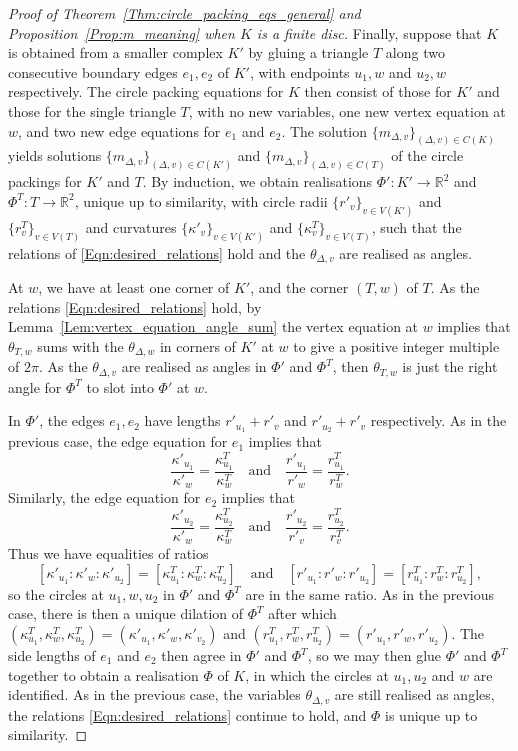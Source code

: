 \documentclass[12pt]{amsart}
\numberwithin{equation}{section}
\theoremstyle{named}
\newcommand{\refeqn}[1]{\eqref{Eqn:#1}}
\newcommand{\reflem}[1]{Lemma~\ref{Lem:#1}}
\newcommand{\refprop}[1]{Proposition~\ref{Prop:#1}}
\newcommand{\refthm}[1]{Theorem~\ref{Thm:#1}}
\newcommand{\R}{\mathbb{R}}
\newcommand{\To}{\longrightarrow}
\begin{document}
\begin{proof}[Proof of \refthm{circle_packing_eqs_general} and \refprop{m_meaning} when $K$ is a finite disc]
Finally, suppose that $K$ is obtained from a smaller complex $K'$ by gluing a triangle $T$ along two consecutive boundary edges $e_1, e_2$ of $K'$, with endpoints $u_1, w$ and $u_2, w$ respectively. The circle packing equations for $K$ then consist of those for $K'$ and those for the single triangle $T$, with no new variables, one new vertex equation at $w$, and two new edge equations for $e_1$ and $e_2$.
The solution $\{m_{\Delta,v}\}_{(\Delta,v) \in C(K)}$ yields solutions $\{m_{\Delta,v}\}_{(\Delta,v) \in C(K')}$ and $\{m_{\Delta,v}\}_{(\Delta,v) \in C(T)}$ of the circle packings for $K'$ and $T$. By induction, we obtain realisations $\Phi' \colon K' \To \R^2$ and $\Phi^T \colon T \To \R^2$, unique up to similarity, with circle radii $\{r'_v\}_{v \in V(K')}$ and $\{r^T_v\}_{v \in V(T)}$ and curvatures $\{\kappa'_v\}_{v \in V(K')}$ and $\{\kappa^T_v\}_{v \in V(T)}$, such that the relations of \refeqn{desired_relations} hold and the $\theta_{\Delta,v}$ are realised as angles.

At $w$, we have at least one corner of $K'$, and the corner $(T, w)$ of $T$. As the relations \refeqn{desired_relations} hold, by \reflem{vertex_equation_angle_sum} the vertex equation at $w$ implies that $\theta_{T,w}$ sums with the $\theta_{\Delta,w}$ in corners of $K'$ at $w$ to give a positive integer multiple of $2\pi$. As the $\theta_{\Delta,v}$ are realised as angles in $\Phi'$ and $\Phi^T$, then $\theta_{T,w}$ is just the right angle for $\Phi^T$ to slot into $\Phi'$ at $w$.

In $\Phi'$, the edges $e_1, e_2$ have lengths $r'_{u_1} + r'_v$ and $r'_{u_2} + r'_v$ respectively. As in the previous case, the edge equation for $e_1$ implies that
\[
\frac{\kappa'_{u_1}}{\kappa'_w} = \frac{\kappa^T_{u_1}}{\kappa^T_w}
\quad \text{and} \quad
\frac{r'_{u_1}}{r'_w} = \frac{r^T_{u_1}}{r^T_w}.
\]
Similarly, the edge equation for $e_2$ implies that
\[
\frac{\kappa'_{u_2}}{\kappa'_w} = \frac{\kappa^T_{u_2}}{\kappa^T_w}
\quad \text{and} \quad
\frac{r'_{u_2}}{r'_v} = \frac{r^T_{u_2}}{r^T_v}.
\]
Thus we have equalities of ratios
\[
\left[ \kappa'_{u_1} : \kappa'_w : \kappa'_{u_2} \right]
= \left[ \kappa^T_{u_1} : \kappa^T_w : \kappa^T_{u_2} \right]
\quad \text{and} \quad
\left[ r'_{u_1} : r'_w : r'_{u_2} \right]
= \left[ r^T_{u_1} : r^T_w : r^T_{u_2} \right],
\]
so the circles at $u_1, w, u_2$ in $\Phi'$ and $\Phi^T$ are in the same ratio. As in the previous case, there is then a unique dilation of $\Phi^T$ after which $(\kappa^T_{u_1}, \kappa^T_w, \kappa^T_{u_2}) = (\kappa'_{u_1}, \kappa'_w, \kappa'_{v_2})$ and $(r^T_{u_1}, r^T_w, r^T_{u_2}) = (r'_{u_1}, r'_w, r'_{u_2})$. The side lengths of $e_1$ and $e_2$ then agree in $\Phi'$ and $\Phi^T$, so we may then glue $\Phi'$ and $\Phi^T$ together to obtain a realisation $\Phi$ of $K$, in which the circles at $u_1, u_2$ and $w$ are identified. As in the previous case, the variables $\theta_{\Delta,v}$ are still realised as angles, the relations \refeqn{desired_relations} continue to hold, and $\Phi$ is unique up to similarity.
\end{proof}
\end{document}
